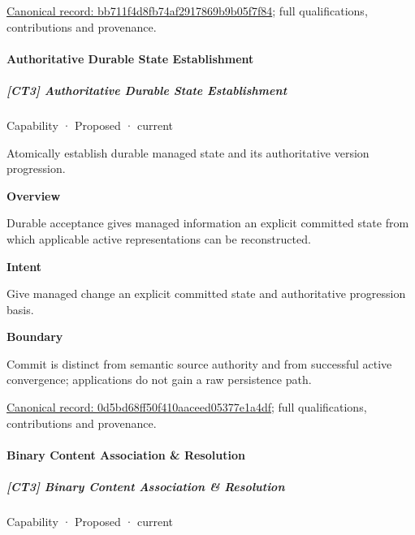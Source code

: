 {\footnotesize \href{../../../../continuum/strategy/capability/bb711f4d8fb74af2917869b9b05f7f84.md}{Canonical record: bb711f4d8fb74af2917869b9b05f7f84}; full qualifications, contributions and provenance.}\par
\paragraph{Authoritative Durable State Establishment}

\subparagraph{[CT3] Authoritative Durable State Establishment}

\label{element:0d5bd68ff50f410aaceed05377e1a4df}
{\small Capability · Proposed · current}\par

Atomically establish durable managed state and its authoritative version progression.



\textbf{Overview}



Durable acceptance gives managed information an explicit committed state from which applicable active representations can be reconstructed.



\textbf{Intent}



Give managed change an explicit committed state and authoritative progression basis.



\textbf{Boundary}



Commit is distinct from semantic source authority and from successful active convergence; applications do not gain a raw persistence path.


{\footnotesize \href{../../../../continuum/strategy/capability/0d5bd68ff50f410aaceed05377e1a4df.md}{Canonical record: 0d5bd68ff50f410aaceed05377e1a4df}; full qualifications, contributions and provenance.}\par
\paragraph{Binary Content Association \& Resolution}

\subparagraph{[CT3] Binary Content Association \& Resolution}

\label{element:5314959509dc4b558711ec169ddee5a0}
{\small Capability · Proposed · current}\par

